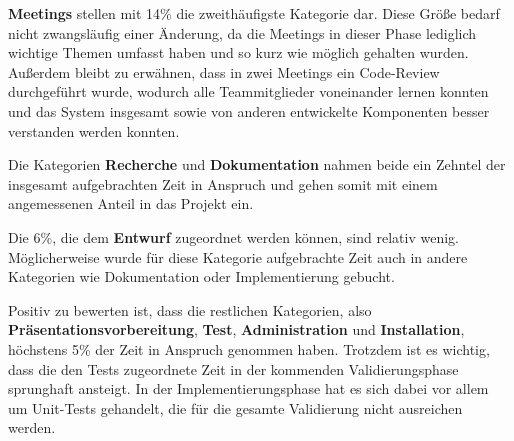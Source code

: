 \documentclass[../review_3.tex]{subfiles}
\begin{document}
\textbf{Meetings} stellen mit 14\% die zweithäufigste Kategorie dar. Diese Größe bedarf nicht zwangsläufig einer Änderung, da die Meetings in dieser Phase lediglich wichtige Themen umfasst haben und so kurz wie möglich gehalten wurden. Außerdem bleibt zu erwähnen, dass in zwei Meetings ein Code-Review durchgeführt wurde, wodurch alle Teammitglieder voneinander lernen konnten und das System insgesamt sowie von anderen entwickelte Komponenten besser verstanden werden konnten.

Die Kategorien \textbf{Recherche} und \textbf{Dokumentation} nahmen beide ein Zehntel der insgesamt aufgebrachten Zeit in Anspruch und gehen somit mit einem angemessenen Anteil in das Projekt ein.

Die 6\%, die dem \textbf{Entwurf} zugeordnet werden können, sind relativ wenig. Möglicherweise wurde für diese Kategorie aufgebrachte Zeit auch in andere Kategorien wie Dokumentation oder Implementierung gebucht.

Positiv zu bewerten ist, dass die restlichen Kategorien, also \textbf{Präsentationsvorbereitung}, \textbf{Test}, \textbf{Administration} und \textbf{Installation}, höchstens 5\% der Zeit in Anspruch genommen haben. Trotzdem ist es wichtig, dass die den Tests zugeordnete Zeit in der kommenden Validierungsphase sprunghaft ansteigt. In der Implementierungsphase hat es sich dabei vor allem um Unit-Tests gehandelt, die für die gesamte Validierung nicht ausreichen werden.
\end{document}
